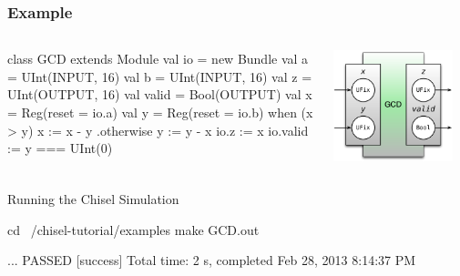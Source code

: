 \documentclass[xcolor=pdflatex,dvipsnames,table]{beamer}
\begin{document}
\begin{frame}[fragile]
\frametitle{Example}
\begin{columns}


\begin{footnotesize}
\begin{scala}
class GCD extends Module {
  val io = new Bundle {
    val a     = UInt(INPUT, 16)
    val b     = UInt(INPUT, 16)
    val z     = UInt(OUTPUT, 16)
    val valid = Bool(OUTPUT) }
  val x = Reg(reset = io.a)
  val y = Reg(reset = io.b)
  when (x > y) {
    x := x - y
  } .otherwise {
    y := y - x
  }
  io.z     := x
  io.valid := y === UInt(0)
}
\end{scala}
\end{footnotesize}


\begin{center}
\includegraphics[width=0.9\textwidth]{figs/gcd.pdf} 
\end{center}

\end{columns}
\end{frame}

\begin{frame}[fragile]{Running the Chisel Simulation}

\begin{bash}
cd ~/chisel-tutorial/examples
make GCD.out
\end{bash}

{
\begin{bash}
...
PASSED
[success] Total time: 2 s, completed Feb 28, 2013 8:14:37 PM
\end{bash}
}

\end{frame}
\end{document}

